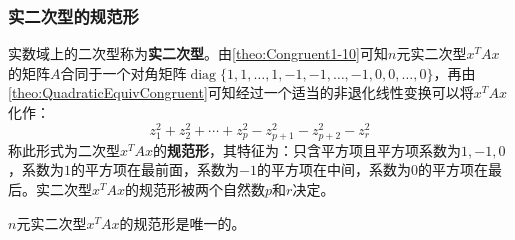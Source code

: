 \subsubsection{实二次型的规范形}
\begin{definition}
	实数域上的二次型称为\textbf{实二次型}。由\cref{theo:Congruent1-10}可知$n$元实二次型$x^TAx$的矩阵$A$合同于一个对角矩阵$\operatorname{diag}\{1,1,\dots,1,-1,-1,\dots,-1,0,0,\dots,0\}$，再由\cref{theo:QuadraticEquivCongruent}可知经过一个适当的非退化线性变换可以将$x^TAx$化作：
	\begin{equation*}
		z_1^2+z_2^2+\cdots+z_p^2-z_{p+1}^2-z_{p+2}^2-z_r^2
	\end{equation*}
	称此形式为二次型$x^TAx$的\textbf{规范形}，其特征为：只含平方项且平方项系数为$1,-1,0$，系数为$1$的平方项在最前面，系数为$-1$的平方项在中间，系数为$0$的平方项在最后。实二次型$x^TAx$的规范形被两个自然数$p$和$r$决定。
\end{definition}
\begin{theorem}
	\label{theo:Sylvester'sLawOfInertia}
	$n$元实二次型$x^TAx$的规范形是唯一的。
\end{theorem}
